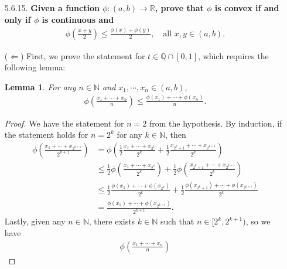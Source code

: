 \documentclass[a4paper,12pt]{article}
\newtheorem{lemma}[theorem]{Lemma}
\begin{document}
\begin{enumerate}
    \item[5.6.15.]
        \boldmath\textbf{Given a function $\phi : (a, b) \to \mathbb{R}$, prove that $\phi$ is convex if and only if $\phi$ is continuous and
        \begin{align*}
            \phi\left( \frac{x + y}{2} \right) \leq \frac{\phi(x) + \phi(y)}{2}, \quad \text{all }x, y \in (a, b).
        \end{align*}
        }\unboldmath \par
        ($\Leftarrow$) First, we prove the statement for $t \in \mathbb{Q} \cap [0, 1]$, which requires the following lemma:
        \begin{lemma}
            For any $n \in \mathbb{N}$ and $x_1, \cdots, x_n \in (a, b)$,
            \begin{align*}
                \phi\left( \frac{x_1 + \cdots + x_n}{n} \right) \leq \frac{\phi(x_1) + \cdots + \phi(x_n)}{n}.
            \end{align*}
        \end{lemma}
        \begin{proof}
            We have the statement for $n = 2$ from the hypothesis. By induction, if the statement holds for $n = 2^k$ for any $k \in \mathbb{N}$, then
            \begin{align*}
                \phi\left( \frac{x_1 + \cdots + x_{2^{k + 1}}}{2^{k + 1}} \right)
                &= \phi\left( \frac{1}{2}\frac{x_1 + \cdots + x_{2^k}}{2^k} + \frac{1}{2}\frac{x_{2^k + 1} + \cdots + x_{2^{k + 1}}}{2^k} \right) \\
                &\leq \frac{1}{2}\phi\left( \frac{x_1 + \cdots + x_{2^k}}{2^k} \right) + \frac{1}{2}\phi\left( \frac{x_{2^k + 1} + \cdots + x_{2^{k + 1}}}{2^k} \right) \\
                &\leq \frac{1}{2}\frac{\phi(x_1) + \cdots + \phi(x_{2^k})}{2^k} + \frac{1}{2}\frac{\phi(x_{2^k + 1}) + \cdots + \phi(x_{2^{k + 1}})}{2^k} \\
                &= \frac{\phi(x_1) + \cdots + \phi(x_{2^{k + 1}})}{2^{k + 1}}.
            \end{align*}
            Lastly, given any $n \in \mathbb{N}$, there exists $k \in \mathbb{N}$ such that $n \in [2^k, 2^{k + 1})$, so we have
            \begin{align*}
                \phi\left( \frac{x_1 + \cdots + x_n}{n} \right)

\end{align*}
\end{proof}
\end{enumerate}
\end{document}
